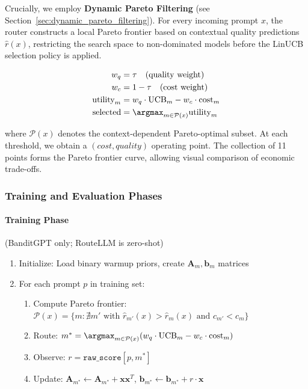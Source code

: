 Crucially, we employ \textbf{Dynamic Pareto Filtering} (see Section~\ref{sec:dynamic_pareto_filtering}). For every incoming prompt $x$, the router constructs a local Pareto frontier based on contextual quality predictions $\hat{r}(x)$, restricting the search space to non-dominated models before the LinUCB selection policy is applied.

\begin{align}
w_q &= \tau \quad \text{(quality weight)} \\
w_c &= 1 - \tau \quad \text{(cost weight)} \\
\text{utility}_m &= w_q \cdot \text{UCB}_m - w_c \cdot \text{cost}_m \\
\text{selected} &= \argmax_{m \in \mathcal{P}(x)} \text{utility}_m
\end{align}

where $\mathcal{P}(x)$ denotes the context-dependent Pareto-optimal subset. At each threshold, we obtain a $(cost, quality)$ operating point. The collection of 11 points forms the Pareto frontier curve, allowing visual comparison of economic trade-offs.

\subsubsection{Training and Evaluation Phases}

\paragraph{Training Phase} (BanditGPT only; RouteLLM is zero-shot)
\begin{enumerate}
    \item Initialize: Load binary warmup priors, create $\mathbf{A}_m, \mathbf{b}_m$ matrices
    \item For each prompt $p$ in training set:
        \begin{enumerate}
            \item Compute Pareto frontier: $\mathcal{P}(x) = \{m : \nexists m' \text{ with } \hat{r}_{m'}(x) > \hat{r}_m(x) \text{ and } c_{m'} < c_m\}$
            \item Route: $m^* = \argmax_{m \in \mathcal{P}(x)} (w_q \cdot \text{UCB}_m - w_c \cdot \text{cost}_m)$
            \item Observe: $r = \texttt{raw\_score}[p, m^*]$
            \item Update: $\mathbf{A}_{m^*} \leftarrow \mathbf{A}_{m^*} + \mathbf{x}\mathbf{x}^T$, $\mathbf{b}_{m^*} \leftarrow \mathbf{b}_{m^*} + r \cdot \mathbf{x}$
        \end{enumerate}
\end{enumerate}


